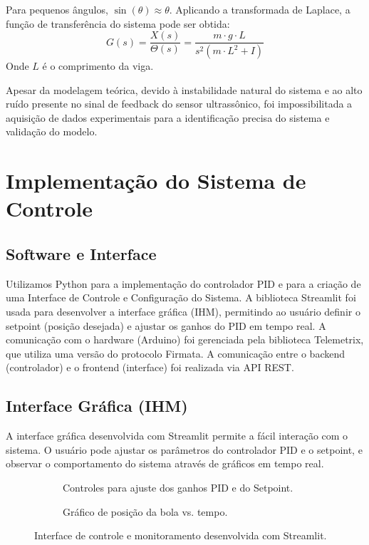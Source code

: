 \documentclass[a4paper, 11pt]{article}
\begin{document}
Para pequenos ângulos, $\sin(\theta) \approx \theta$. Aplicando a transformada de Laplace, a função de transferência do sistema pode ser obtida:
$$
G(s) = \frac{X(s)}{\Theta(s)} = \frac{m \cdot g \cdot L}{s^2(m \cdot L^2 + I)}
$$
Onde $L$ é o comprimento da viga.

Apesar da modelagem teórica, devido à instabilidade natural do sistema e ao alto ruído presente no sinal de feedback do sensor ultrassônico, foi impossibilitada a aquisição de dados experimentais para a identificação precisa do sistema e validação do modelo.

\section{Implementação do Sistema de Controle}
\subsection{Software e Interface}Utilizamos Python para a implementação do controlador PID e para a criação de uma Interface de Controle e Configuração do Sistema. A biblioteca Streamlit foi usada para desenvolver a interface gráfica (IHM), permitindo ao usuário definir o setpoint (posição desejada) e ajustar os ganhos do PID em tempo real. A comunicação com o hardware (Arduino) foi gerenciada pela biblioteca Telemetrix, que utiliza uma versão do protocolo Firmata. A comunicação entre o backend (controlador) e o frontend (interface) foi realizada via API REST.\subsection{Interface Gráfica (IHM)}A interface gráfica desenvolvida com Streamlit permite a fácil interação com o sistema. O usuário pode ajustar os parâmetros do controlador PID e o setpoint, e observar o comportamento do sistema através de gráficos em tempo real.\begin{figure}[h!]    \centering    \begin{subfigure}[b]{0.45\textwidth}        \centering        {}        \caption{Controles para ajuste dos ganhos PID e do Setpoint.}        \label{fig:streamlit_controles}    \end{subfigure}    \hfill    \begin{subfigure}[b]{0.45\textwidth}        \centering        {}        \caption{Gráfico de posição da bola vs. tempo.}        \label{fig:streamlit_grafico}    \end{subfigure}    \caption{Interface de controle e monitoramento desenvolvida com Streamlit.}    \label{fig:streamlit_interface}\end{figure}
\end{document}
